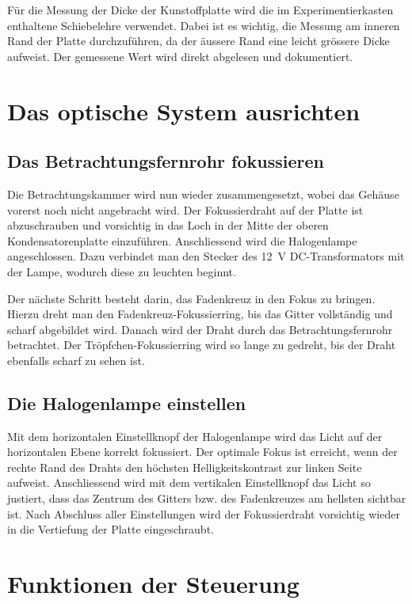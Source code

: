 Für die Messung der Dicke der Kunstoffplatte wird die im Experimentierkasten enthaltene Schiebelehre verwendet. Dabei ist es wichtig, die Messung am inneren Rand der Platte durchzuführen, da der äussere Rand eine leicht grössere Dicke aufweist. Der gemessene Wert wird direkt abgelesen und dokumentiert.

\section{Das optische System ausrichten}\label{sec:optischesSystem}
\subsection{Das Betrachtungsfernrohr fokussieren}
Die Betrachtungskammer wird nun wieder zusammengesetzt, wobei das Gehäuse vorerst noch nicht angebracht wird. Der Fokussierdraht auf der Platte ist abzuschrauben und vorsichtig in das Loch in der Mitte der oberen Kondensatorenplatte einzuführen. Anschliessend wird die Halogenlampe angeschlossen. Dazu verbindet man den Stecker des 12~V DC-Transformators mit der Lampe, wodurch diese zu leuchten beginnt.

Der nächste Schritt besteht darin, das Fadenkreuz in den Fokus zu bringen. Hierzu dreht man den Fadenkreuz-Fokussierring, bis das Gitter vollständig und scharf abgebildet wird. Danach wird der Draht durch das Betrachtungsfernrohr betrachtet. Der Tröpfchen-Fokussierring wird so lange zu gedreht, bis der Draht ebenfalls scharf zu sehen ist.

\subsection{Die Halogenlampe einstellen}\label{sub:Halogenlampe}
Mit dem horizontalen Einstellknopf der Halogenlampe wird das Licht auf der horizontalen Ebene korrekt fokussiert. Der optimale Fokus ist erreicht, wenn der rechte Rand des Drahts den höchsten Helligkeitskontrast zur linken Seite aufweist. Anschliessend wird mit dem vertikalen Einstellknopf das Licht so justiert, dass das Zentrum des Gitters bzw. des Fadenkreuzes am hellsten sichtbar ist. Nach Abschluss aller Einstellungen wird der Fokussierdraht vorsichtig wieder in die Vertiefung der Platte eingeschraubt.

\section{Funktionen der Steuerung}\label{sec:funktionen}
